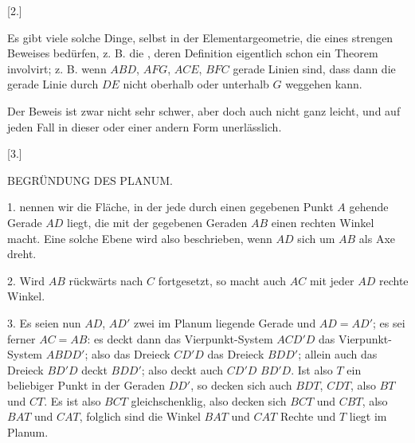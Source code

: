 \begin{center}[2.]\end{center}


Es gibt viele solche Dinge, selbst in der Elementargeometrie, die eines strengen
Beweises bedürfen, z. B. die , deren Definition eigentlich
schon ein Theorem involvirt; z. B. wenn $ABD$, $AFG$, $ACE$, $BFC$ gerade Linien
sind, dass dann die gerade Linie durch $DE$ nicht oberhalb oder unterhalb $G$
weggehen kann.

\begin{center}

\end{center}

Der Beweis ist zwar nicht sehr schwer, aber doch auch nicht ganz leicht, und auf
jeden Fall in dieser oder einer andern Form unerlässlich.



\begin{center}[3.]\end{center}


\begin{center}BEGRÜNDUNG DES PLANUM.\end{center}


1.  nennen wir die Fläche, in der jede durch einen gegebenen Punkt $A$
gehende Gerade $AD$ liegt, die mit der gegebenen Geraden $AB$ einen rechten
Winkel macht. Eine solche Ebene wird also beschrieben, wenn $AD$ sich um $AB$
als Axe dreht.

2. Wird $AB$ rückwärts nach $C$ fortgesetzt, so macht auch $AC$ mit jeder $AD$
rechte Winkel.

\begin{center}

\end{center}

3. Es seien nun $AD$, $AD'$ zwei im Planum liegende Gerade und $AD = AD'$; es
sei ferner $AC = AB$: es deckt dann das Vierpunkt-System $ACD'D$ das
Vierpunkt-System $ABDD'$; also das Dreieck $CD'D$ das Dreieck $BDD'$; allein
auch das Dreieck $BD'D$ deckt $BDD'$; also deckt auch $CD'D$ $BD'D$. Ist also
$T$ ein beliebiger Punkt in der Geraden $DD'$, so decken sich auch $BDT$,
$CDT$, also $BT$ und $CT$. Es ist also $BCT$ gleichschenklig, also decken sich
$BCT$ und $CBT$, also $BAT$ und $CAT$, folglich sind die Winkel $BAT$ und $CAT$
Rechte und $T$ liegt im Planum.

